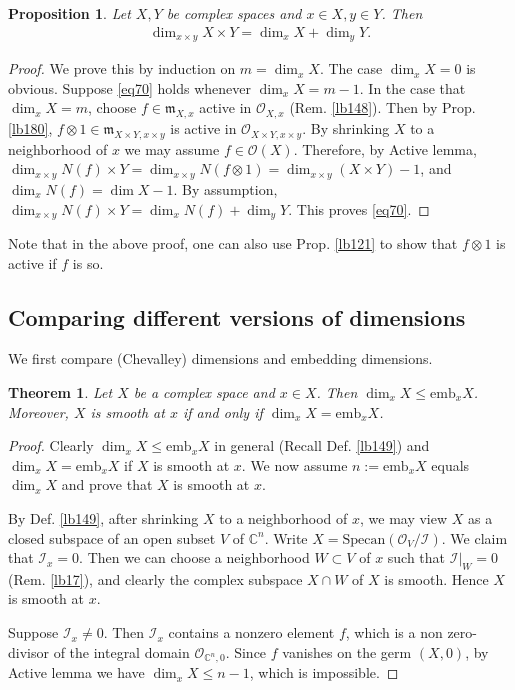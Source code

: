 \documentclass[12pt,b5paper,notitlepage]{report}
\theoremstyle{definition}
\theoremstyle{plain}
\newtheorem{thm}[df]{Theorem}
\newtheorem{pp}[df]{Proposition}
\newcommand{\fk}{\mathfrak}
\newcommand{\mc}{\mathcal}
\newcommand{\scr}{\mathscr}
\newcommand{\Cbb}{\mathbb C}
\newcommand{\Specan}{\mathrm{Specan}}
\newcommand{\emb}{\mathrm{emb}}
\numberwithin{equation}{section}
\begin{document}
\begin{pp}\label{lb152}
Let $X,Y$ be complex spaces and $x\in X,y\in Y$. Then
\begin{align}
\dim_{x\times y} X\times Y=\dim_xX+\dim_yY.\label{eq70}
\end{align}
\end{pp}



\begin{proof}
We prove this by induction on $m=\dim_xX$. The case $\dim_xX=0$ is obvious. Suppose \eqref{eq70} holds whenever $\dim_xX=m-1$. In the case that $\dim_xX=m$, choose  $f\in\fk m_{X,x}$ active in $\scr O_{X,x}$ (Rem. \ref{lb148}). Then by Prop. \ref{lb180}, $f\otimes 1\in\fk m_{X\times Y,x\times y}$ is active in $\scr O_{X\times Y,x\times y}$. By shrinking $X$ to a neighborhood of $x$ we may assume $f\in\scr O(X)$.  Therefore, by Active lemma,  $\dim_{x\times y}N(f)\times Y=\dim_{x\times y}N(f\otimes 1)=\dim_{x\times y}(X\times Y)-1$, and $\dim_x N(f)=\dim X-1$. By assumption, $\dim_{x\times y}N(f)\times Y=\dim_xN(f)+\dim_yY$. This proves \eqref{eq70}.
\end{proof}


Note that in the above proof, one can also use Prop. \ref{lb121} to show that $f\otimes 1$ is active if $f$ is so.


\subsection{Comparing different versions of dimensions}

We first compare (Chevalley) dimensions and embedding dimensions.

\begin{thm}\label{lb184}
Let $X$ be a complex space and $x\in X$. Then $\dim_xX\leq \emb_xX$. Moreover, $X$ is smooth at $x$ if and only if $\dim_xX=\emb_xX$.
\end{thm}


\begin{proof}
Clearly $\dim_x X\leq\emb_xX$ in general (Recall Def. \ref{lb149}) and $\dim_xX=\emb_xX$ if $X$ is smooth at $x$. We now assume $n:=\emb_xX$ equals $\dim_xX$ and prove that $X$ is smooth at $x$. 

By Def. \ref{lb149}, after shrinking $X$ to a neighborhood of $x$, we may view $X$ as a closed subspace of an open subset $V$ of $\Cbb^n$. Write $X=\Specan(\scr O_V/\mc I)$. We claim that $\mc I_x=0$. Then we can choose a neighborhood $W\subset V$ of $x$ such that $\mc I|_W=0$ (Rem. \ref{lb17}), and clearly the complex subspace $X\cap W$ of $X$ is smooth. Hence $X$ is smooth at $x$.

Suppose $\mc I_x\neq0$. Then $\mc I_x$ contains a nonzero element $f$, which is a non zero-divisor of the integral domain $\scr O_{\Cbb^n,0}$. Since $f$ vanishes on the germ $(X,0)$, by Active lemma we have $\dim_xX\leq n-1$, which is  impossible. 
\end{proof}
\end{document}
